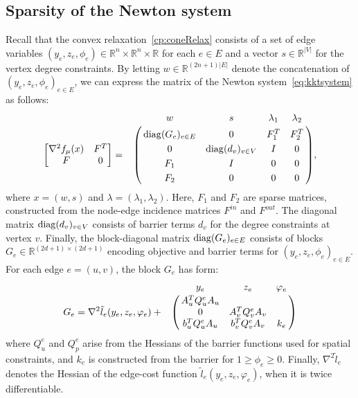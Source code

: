 \documentclass[letterpaper, 11pt]{article}
\begin{document}
\subsection{Sparsity of the Newton system}


Recall that the convex relaxation~\eqref{cp:coneRelax} consists
of a set of edge variables $(y_e , z_e, \phi_e) \in
\mathbb{R}^n \times \mathbb{R}^n \times \mathbb{R}$ for each $e \in E$
and a vector $s \in \mathbb{R}^{|V|}$ for the vertex degree constraints.  By letting $w \in
\mathbb{R}^{(2n+1)|E|}$ denote the concatenation of $(y_e, z_e, \phi_e)_{e \in
E}$, we can express the matrix of the Newton system~\eqref{eq:kktsystem}
as follows:
\begin{align}
  \begin{bmatrix}
    \nabla^2 f_\mu(x)  & F^T  \\
    F  & 0 
  \end{bmatrix} = 
  \bordermatrix{~& w & s & \lambda_1 & \lambda_2  \cr
  &  \diag(G_e)_{e \in E}  & 0  &  F_1^T & F_2^T  \cr
  &  0  & \diag(d_v)_{v \in V}   & I & 0\cr
  &  F_1  & I & 0  & 0 \cr
  &  F_2  & 0 & 0  & 0\cr
  },
\end{align}
where $x = (w, s)$ and $\lambda = (\lambda_1, \lambda_2)$.  Here,  $F_1$ and $F_2$ are sparse matrices, constructed from the node-edge incidence matrices $F^{in}$ and $F^{out}$.
The diagonal matrix $\operatorname*{diag}(d_v)_{v \in V}$  consists of barrier terms $d_v$ for the degree constraints at vertex $v$.
Finally, the block-diagonal matrix $\operatorname*{diag}(G_e)_{e \in E}$ consists
of blocks $G_e \in \mathbb{R}^{ (2d + 1) \times (2d+1)}$ encoding objective and barrier terms for $(y_e, z_e, \phi_e)_{e \in E}$. For each edge $e=(u,v)$, the block $G_e$ has form:
\[
G_e =
\nabla^2 \tilde l_e(y_e, z_e, \varphi_e) +
  \bordermatrix{~& y_e & z_e & \varphi_e  \cr
&  A_u^T Q^e_u A_u  \cr
&    0          & A_v^T Q^e_v A_v \cr
&   b_u^T Q^e_u A_u    & b_v^T Q^e_v A_v      &  k_e  \cr
 }
\]
where   $Q^e_u$  and $Q^e_p$ arise from the Hessians
of the barrier functions used for spatial constraints,
and $k_{e}$ is constructed from the barrier for $1 \ge \phi_e \ge 0$.
Finally, $\nabla^2 \tilde l_e$ denotes the Hessian of  the edge-cost function $\tilde l_e(y_e, z_e, \varphi_e)$,
when it is twice differentiable.



\end{document}
